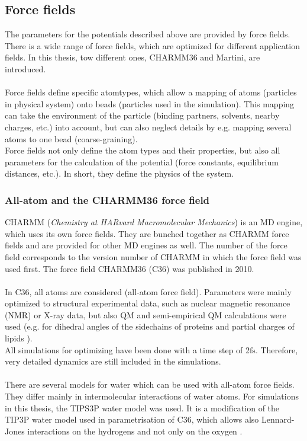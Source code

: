 \subsection{Force fields}
The parameters for the potentials described above are provided by force fields. There is a wide range of force fields, which are optimized for different application fields. In this thesis, tow different ones, CHARMM36 and Martini, are introduced.\\
\\
Force fields define specific atomtypes, which allow a mapping of atoms (particles in physical system) onto beads (particles used in the simulation). This mapping can take the environment of the particle (binding partners, solvents, nearby charges, etc.) into account, but can also neglect details by e.g. mapping several atoms to one bead (coarse-graining).\\
Force fields not only define the atom types and their properties, but also all parameters for the calculation of the potential (force constants, equilibrium distances, etc.). In short, they define the physics of the system.
\subsubsection{All-atom and the CHARMM36 force field}
CHARMM (\textit{Chemistry at HARvard Macromolecular Mechanics}) is an MD engine, which uses its own force fields. They are bunched together as CHARMM force fields and are provided for other MD engines as well. The number of the force field corresponds to the version number of CHARMM in which the force field was used first. The force field CHARMM36 \autocites{charmm36_protein}{charmm36_lipids} (C36) was published in 2010.\\
\\
In C36, all atoms are considered (all-atom force field). Parameters were mainly optimized to structural experimental data, such as nuclear magnetic resonance (NMR) or X-ray data, but also QM and semi-empirical QM calculations were used (e.g. for dihedral angles of the sidechains of proteins \autocite{charmm36_protein} and partial charges of lipids \autocite{charmm36_lipids}).\\
All simulations for optimizing have been done with a time step of 2$\si{\femto\second}$. Therefore, very detailed dynamics are still included in the simulations.\\
\\
There are several models for water which can be used with all-atom force fields. They differ mainly in intermolecular interactions of water atoms. For simulations in this thesis, the TIPS3P water model was used. It is a modification of the TIP3P water model \autocite{tip3p} used in parametrisation of C36, which allows also Lennard-Jones interactions on the hydrogens and not only on the oxygen \autocite{charmm36_protein}. %
